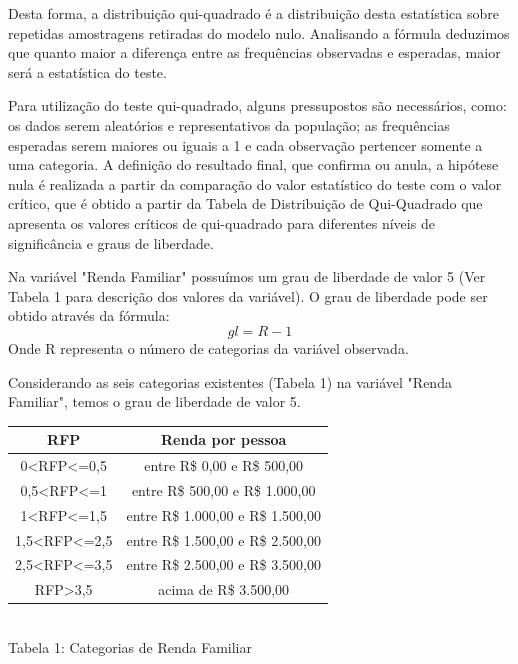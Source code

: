 \documentclass[conference]{IEEEtran}
\begin{document}
Desta forma, a distribuição qui-quadrado é a distribuição desta estatística sobre repetidas amostragens retiradas do modelo nulo. Analisando a fórmula deduzimos que quanto maior a diferença entre as frequências observadas e esperadas, maior será a estatística do teste.\par
Para utilização do teste qui-quadrado, alguns pressupostos são necessários, como: os dados serem aleatórios e representativos da população; as frequências esperadas serem maiores ou iguais a 1 e cada observação pertencer somente a uma categoria. A definição do resultado final, que confirma ou anula, a hipótese nula é realizada a partir da comparação do valor estatístico do teste com o valor crítico, que é obtido a partir da Tabela de Distribuição de Qui-Quadrado que apresenta os valores críticos de qui-quadrado para diferentes níveis de significância e graus de liberdade.\par
Na variável "Renda Familiar" possuímos um grau de liberdade de valor 5 (Ver Tabela 1 para descrição dos valores da variável). O grau de liberdade pode ser obtido através da fórmula:
\[ gl = R - 1 \]
Onde R representa o número de categorias da variável observada.\par
Considerando as seis categorias existentes (Tabela 1) na variável "Renda Familiar", temos o grau de liberdade de valor 5.

\begin{center}
    \begin{tabular}{ |c|c| } 
        \hline
        \textbf{RFP} & \textbf{Renda por pessoa} \\
        \hline
        0<RFP<=0,5 & entre R\$ 0,00 e R\$ 500,00 \\
        \hline
        0,5<RFP<=1 & entre R\$ 500,00 e R\$ 1.000,00 \\
        \hline
        1<RFP<=1,5 & entre R\$ 1.000,00 e R\$ 1.500,00 \\
        \hline
        1,5<RFP<=2,5 & entre R\$ 1.500,00 e R\$ 2.500,00 \\
        \hline
        2,5<RFP<=3,5 & entre R\$ 2.500,00 e R\$ 3.500,00 \\ 
        \hline
        RFP>3,5 & acima de R\$ 3.500,00 \\
        \hline
    \end{tabular} \\
    Tabela 1: Categorias de Renda Familiar
\end{center}
\end{document}
